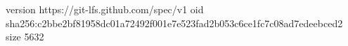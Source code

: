 version https://git-lfs.github.com/spec/v1
oid sha256:c2bbe2bf81958dc01a72492f001e7e523fad2b053c6ce1fc7c08ad7edeebced2
size 5632
